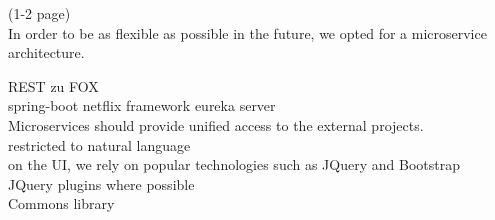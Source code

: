 (1-2 page)\\
In order to be as flexible as possible in the future, we opted for a microservice architecture. 


REST zu FOX\\
spring-boot netflix framework eureka server\\
Microservices should provide unified access to the external projects.\\
restricted to natural language\\
on the UI, we rely on popular technologies such as JQuery and Bootstrap\\
JQuery plugins where possible\\
Commons library\\